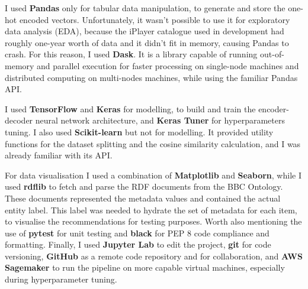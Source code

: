 I used \textbf{Pandas} only for tabular data manipulation, to generate and store the one-hot encoded vectors. Unfortunately, it wasn't possible
to use it for exploratory data analysis (EDA), because the iPlayer catalogue used in development had roughly one-year worth of data and it didn't
fit in memory, causing Pandas to crash. For this reason, I used \textbf{Dask}. It is a library capable of running out-of-memory and
parallel execution for faster processing on single-node machines and distributed computing on multi-nodes machines, while using the familiar Pandas API.

I used \textbf{TensorFlow} and \textbf{Keras} for modelling, to build and train the encoder-decoder neural network architecture,
and \textbf{Keras Tuner} for
hyperparameters tuning. I also used \textbf{Scikit-learn} but not for modelling. It provided utility functions for the dataset splitting and
the cosine similarity calculation, and I was already familiar with its API.

For data visualisation I used a combination of \textbf{Matplotlib} and \textbf{Seaborn}, while I used \textbf{rdflib} to fetch and parse
the RDF documents from the BBC Ontology. These documents represented the metadata values and contained the actual entity label.
This label was needed to hydrate the set of metadata for each item, to visualise the recommendations for testing purposes.
Worth also mentioning the use of \textbf{pytest} for unit testing and \textbf{black} for PEP 8 code compliance and formatting.
Finally, I used \textbf{Jupyter Lab} to edit the project, \textbf{git} for code versioning, \textbf{GitHub} as a remote code repository
and for collaboration, and \textbf{AWS Sagemaker} to run the pipeline on more capable virtual machines, especially during hyperparameter tuning.
